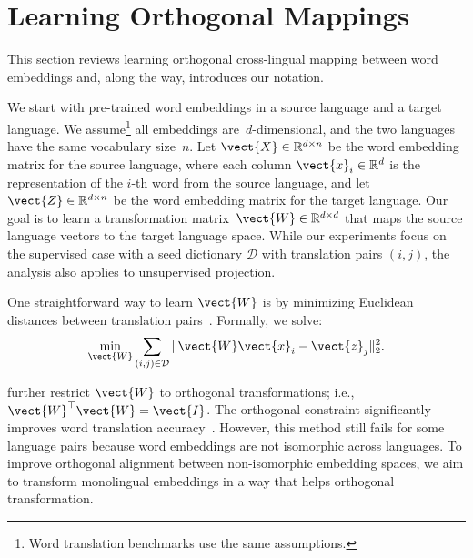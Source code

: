 \section{Learning Orthogonal Mappings}\label{sec:prelim}

This section reviews learning orthogonal
cross-lingual mapping between word embeddings and, along the way,
introduces our
notation.

We start with pre-trained word embeddings in a source language and a
target language.
We assume\footnote{Word translation benchmarks
use the same assumptions.}
 all embeddings are~$d$-dimensional, and the two languages
have the same vocabulary size~$n$.
Let $\vect{X} \in \mathbb{R}^{d \times n}$ be the word embedding
matrix for the source language, where each column $\vect{x}_i \in
\mathbb{R}^d$ is the representation of the $i$-th word from the source
language, and let $\vect{Z} \in \mathbb{R}^{d \times n}$ be the word
embedding matrix for the target language.
Our goal is to learn a transformation matrix~$\vect{W} \in
\mathbb{R}^{d\times d}$ that maps the source language vectors to the
target language space.
%
While our experiments focus on the supervised case with a seed dictionary $\mathcal{D}$
with translation pairs $(i, j)$, the analysis also applies to
unsupervised projection.

One straightforward way to learn $\vect{W}$ is by minimizing Euclidean
distances between translation pairs~\citep{mikolov-13b}.  Formally, we
solve:
\begin{equation}\label{eq:obj}
\min_{\vect{W}} \sum_{(i,j) \in \mathcal{D}} \| \vect{W} \vect{x}_i - \vect{z}_j \|_2^2.
\end{equation}

\citet{xing-15} further restrict $\vect{W}$ to orthogonal
transformations; i.e., $\vect{W}^\top \vect{W} = \vect{I}$.
The orthogonal constraint significantly improves word translation
accuracy~\citep{artetxe-16}.
However, this method still fails for some
language pairs because word embeddings are not isomorphic across
languages.
To improve orthogonal alignment between non-isomorphic embedding
spaces, we aim to transform monolingual embeddings in a way that helps
orthogonal transformation.
